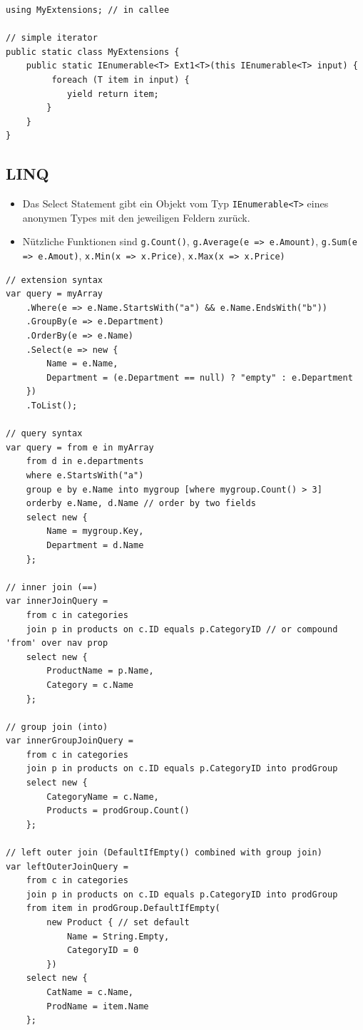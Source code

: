 \documentclass[
a4paper,
oneside,
10pt,
fleqn,
headsepline,
toc=listofnumbered, 
bibliography=totocnumbered]{scrartcl}
\begin{document}
\begin{lstlisting}
using MyExtensions; // in callee

// simple iterator
public static class MyExtensions {
	public static IEnumerable<T> Ext1<T>(this IEnumerable<T> input) {
		 foreach (T item in input) {
			yield return item;
		}
	}
}
\end{lstlisting}

\clearpage

\subsection{LINQ}
\begin{itemize}
	\item Das Select Statement gibt ein Objekt vom Typ \lstinline|IEnumerable<T>| eines anonymen Types mit den jeweiligen Feldern zurück.
	\item Nützliche Funktionen sind \lstinline|g.Count()|, \lstinline|g.Average(e => e.Amount)|, \lstinline|g.Sum(e => e.Amout)|, \lstinline|x.Min(x => x.Price)|, \lstinline|x.Max(x => x.Price)|
\end{itemize}
\begin{lstlisting}
// extension syntax
var query = myArray
	.Where(e => e.Name.StartsWith("a") && e.Name.EndsWith("b"))
	.GroupBy(e => e.Department)
	.OrderBy(e => e.Name)
	.Select(e => new {
		Name = e.Name,
		Department = (e.Department == null) ? "empty" : e.Department
	})
	.ToList();

// query syntax
var query = from e in myArray
	from d in e.departments
	where e.StartsWith("a")
	group e by e.Name into mygroup [where mygroup.Count() > 3]
	orderby e.Name, d.Name // order by two fields
	select new {
		Name = mygroup.Key,
		Department = d.Name
	};
	
// inner join (==)
var innerJoinQuery =
    from c in categories
    join p in products on c.ID equals p.CategoryID // or compound 'from' over nav prop
    select new { 
	    ProductName = p.Name, 
	    Category = c.Name 
	};
	
// group join (into)
var innerGroupJoinQuery =
    from c in categories
    join p in products on c.ID equals p.CategoryID into prodGroup
    select new { 
	    CategoryName = c.Name, 
	    Products = prodGroup.Count()
	};
	
// left outer join (DefaultIfEmpty() combined with group join)
var leftOuterJoinQuery =
    from c in categories
    join p in products on c.ID equals p.CategoryID into prodGroup
    from item in prodGroup.DefaultIfEmpty(
	    new Product { // set default
		    Name = String.Empty, 
		    CategoryID = 0 
		})
    select new { 
	    CatName = c.Name, 
	    ProdName = item.Name 
	};
\end{lstlisting}
\end{document}
